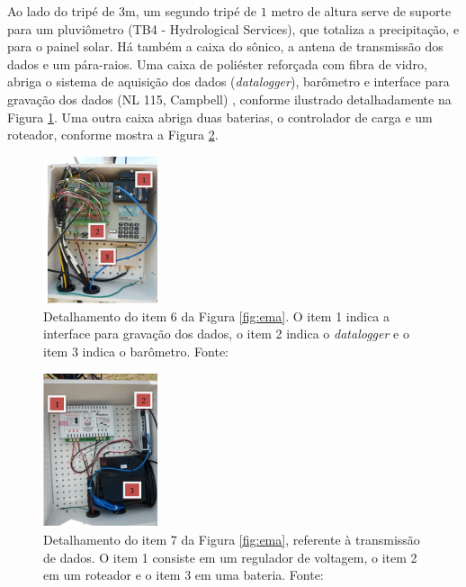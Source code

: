 Ao lado do tripé de $3$m, um segundo tripé de $1$ metro de altura serve de suporte para um pluviômetro (TB4 - Hydrological Services), que totaliza a precipitação, e para o painel solar. Há também a caixa do sônico, a antena de transmissão dos dados e um pára-raios. Uma caixa de poliéster reforçada com fibra de vidro, abriga o sistema de aquisição dos dados (\emph{datalogger}), barômetro e interface para gravação dos dados (NL 115, Campbell) \cite{Labinstru:EST}, conforme ilustrado detalhadamente na Figura \ref{fig:ema2}. Uma outra caixa abriga duas baterias, o controlador de carga e um roteador, conforme mostra a Figura \ref{fig:ema3}.

\begin{figure}[h!]
	\centering
	\includegraphics[width=0.3\textwidth]{./img/ema6.png}
	\caption{Detalhamento do item 6 da Figura \ref{fig:ema}. O item 1 indica a interface para gravação dos dados, o item 2 indica o \emph{datalogger} e o item 3 indica o barômetro. Fonte: \cite{Labinstru:EST}} \label{fig:ema2}
\end{figure}

\begin{figure}[h!]
	\centering
	\includegraphics[width=0.3\textwidth]{./img/ema7.png}
	\caption{Detalhamento do item 7 da Figura  \ref{fig:ema}, referente à transmissão de dados. O item 1 consiste em um regulador de voltagem, o item 2 em um roteador e o item 3 em uma bateria. Fonte: \cite{Labinstru:EST}} \label{fig:ema3}
\end{figure}

